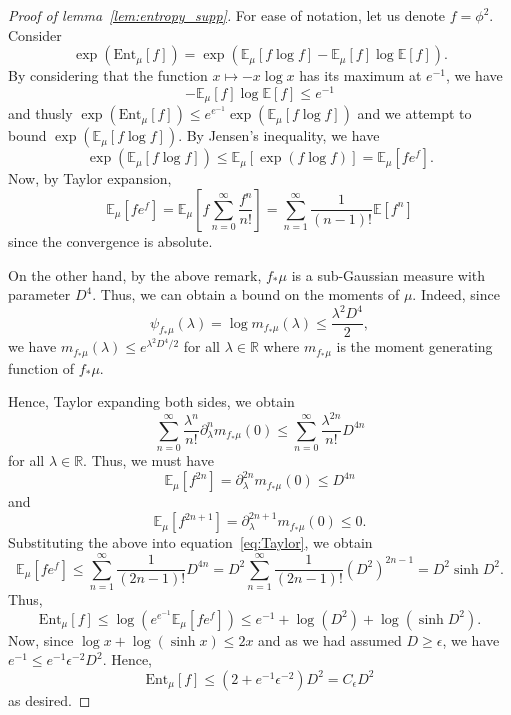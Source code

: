 \begin{proof}[Proof of lemma~\ref{lem:entropy_supp}]
  For ease of notation, let us denote \(f = \phi^2\). Consider 
  \[\exp(\text{Ent}_\mu[f]) = \exp(\mathbb{E}_\mu[f\log f] - \mathbb{E}_\mu[f]\log\mathbb{E}[f]).\]
  By considering that the function \(x \mapsto -x\log x\) has its maximum at \(e^{-1}\), we have
  \[- \mathbb{E}_\mu[f]\log\mathbb{E}[f] \le e^{-1}\]
  and thusly \(\exp(\text{Ent}_\mu[f]) \le e^{e^{-1}}\exp(\mathbb{E}_\mu[f\log f])\) and 
  we attempt to bound \(\exp(\mathbb{E}_\mu[f\log f])\). By Jensen's inequality, we have 
  \[\exp(\mathbb{E}_\mu[f\log f]) \le \mathbb{E}_\mu[\exp(f\log f)] = \mathbb{E}_\mu[f e^f].\]
  Now, by Taylor expansion,
  \begin{equation}\label{eq:Taylor}
    \mathbb{E}_\mu[f e^f] = \mathbb{E}_\mu\left[f \sum_{n = 0}^\infty \frac{f^n}{n!}\right]
      = \sum_{n = 1}^\infty \frac{1}{(n - 1)!} \mathbb{E}[f^n]
  \end{equation}
  since the convergence is absolute. 

  On the other hand, by the above remark, \(f_* \mu\) is a sub-Gaussian measure with parameter \(D^4\).
  Thus, we can obtain a bound on the moments of \(\mu\). Indeed, since
  \[\psi_{f_*\mu}(\lambda) = \log m_{f_*\mu}(\lambda) \le \frac{\lambda^2 D^4}{2},\]
  we have \(m_{f_*\mu}(\lambda) \le e^{\lambda^2 D^4 / 2}\) for all \(\lambda \in \mathbb{R}\)
  where \(m_{f_*\mu}\) is the moment generating function of \(f_* \mu\).  

  Hence, Taylor expanding both sides, we obtain
  \[\sum_{n = 0}^\infty \frac{\lambda^n}{n!}\partial_\lambda^n m_{f_*\mu}(0) \le \sum_{n = 0}^\infty \frac{\lambda^{2n}}{n!}D^{4n}\]
  for all \(\lambda \in \mathbb{R}\). Thus, we must have 
  \[\mathbb{E}_\mu[f^{2n}] = \partial_\lambda^{2n} m_{f_*\mu}(0) \le D^{4n}\]
  and 
  \[\mathbb{E}_\mu[f^{2n + 1}] = \partial_\lambda^{2n + 1} m_{f_*\mu}(0) \le 0.\]
  Substituting the above into equation~\eqref{eq:Taylor}, we obtain
  \[\mathbb{E}_\mu[fe^f] \le \sum_{n = 1}^\infty \frac{1}{(2n - 1)!}D^{4n}
      = D^2 \sum_{n = 1}^\infty \frac{1}{(2n - 1)!}(D^2)^{2n - 1}
      = D^2 \sinh D^2.\]
  Thus, 
  \[\text{Ent}_\mu[f] \le \log(e^{e^{-1}}\mathbb{E}_\mu[fe^f])
    \le e^{-1} + \log(D^2) + \log (\sinh D^2).\]
  Now, since \(\log x + \log (\sinh x) \le 2x\) and as we had assumed \(D \ge \epsilon\), we have 
  \(e^{-1} \le e^{-1}\epsilon^{-2} D^2\). Hence,
  \[\text{Ent}_\mu[f] \le (2 + e^{-1}\epsilon^{-2})D^2 = C_\epsilon D^2\]
  as desired.
\end{proof}
